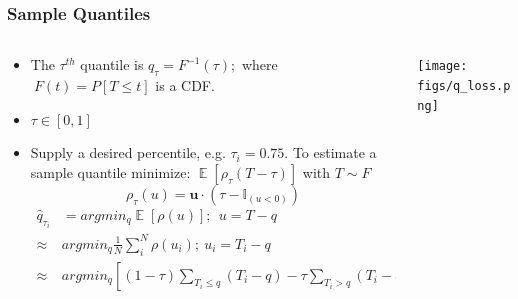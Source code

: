 \documentclass[t, pdftex]{beamer}
\DeclareMathOperator*{\E}{\mathbb{E}}
\begin{document}
\begin{frame}
\frametitle{Sample Quantiles}
\vspace{-15pt}
\begin{columns}
\begin{column}{0.5\textwidth}
    \scriptsize{
        \begin{itemize}
            \item The $\tau^{th}$ quantile is $q_\tau = F^{-1}(\tau); $ where $\ F(t)=P[T \leq t]$ is a CDF.
            \item $\tau \in [0, 1]$
            \item Supply a desired percentile, e.g. $\tau_i = 0.75$.
            To estimate a sample quantile minimize: $\E[\rho_\tau(T - \tau)]$ with $T \sim F$
            \[
            \rho_\tau( u) = \mathbf u \cdot (\tau - \mathbb{I}_{( u < 0)})
            \]
            \begin{equation}
            \left.\begin{aligned}
            \hat q_{\tau_i} &= argmin_{q} \E[\rho(u)];\ \  u = T - q  \\
            \approx & argmin_q  \frac{1}{N} \sum_i^N \rho(u_i); \ u_i = T_i - q \\
            \approx & argmin_q \left[ (1-\tau) \sum_{T_i \leq q}( T_i - q ) - \tau \sum_{T_i > q} (T_i - q) \right]
            \end{aligned}\right. \nonumber
            \end{equation}
        \end{itemize}
    }
\end{column}
\begin{column}{0.5\textwidth}  %
    \begin{center}
        \texttt{[image: figs/q\_loss.png]}
    \end{center}
\end{column}
\end{columns}
\end{frame}
\end{document}
